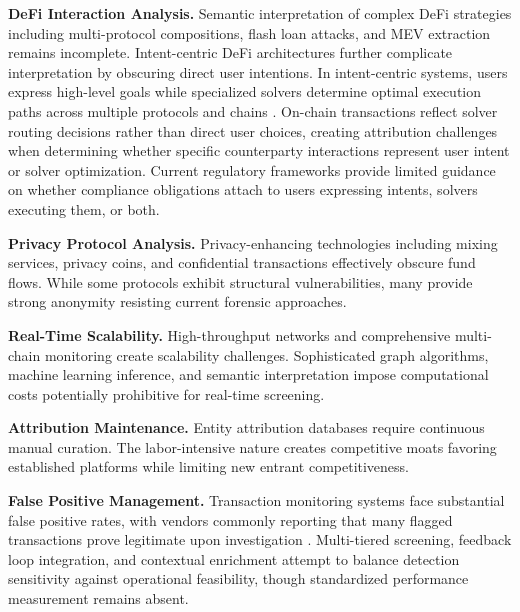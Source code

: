 \noindent\textbf{DeFi Interaction Analysis.}
Semantic interpretation of complex DeFi strategies including multi-protocol compositions, flash loan attacks, and MEV extraction remains incomplete. Intent-centric DeFi architectures further complicate interpretation by obscuring direct user intentions. In intent-centric systems, users express high-level goals while specialized solvers determine optimal execution paths across multiple protocols and chains \cite{mao2025motivationexecutiongrounded}. On-chain transactions reflect solver routing decisions rather than direct user choices, creating attribution challenges when determining whether specific counterparty interactions represent user intent or solver optimization. Current regulatory frameworks provide limited guidance on whether compliance obligations attach to users expressing intents, solvers executing them, or both.

\noindent\textbf{Privacy Protocol Analysis.} 
Privacy-enhancing technologies including mixing services, privacy coins, and confidential transactions effectively obscure fund flows. While some protocols exhibit structural vulnerabilities, many provide strong anonymity resisting current forensic approaches.

\noindent\textbf{Real-Time Scalability.} 
High-throughput networks and comprehensive multi-chain monitoring create scalability challenges. Sophisticated graph algorithms, machine learning inference, and semantic interpretation impose computational costs potentially prohibitive for real-time screening.

\noindent\textbf{Attribution Maintenance.} 
Entity attribution databases require continuous manual curation. The labor-intensive nature creates competitive moats favoring established platforms while limiting new entrant competitiveness.

\noindent\textbf{False Positive Management.} 
Transaction monitoring systems face substantial false positive rates, with vendors commonly reporting that many flagged transactions prove legitimate upon investigation \cite{alotibi2022moneylaunderingdetection}. Multi-tiered screening, feedback loop integration, and contextual enrichment attempt to balance detection sensitivity against operational feasibility, though standardized performance measurement remains absent.
